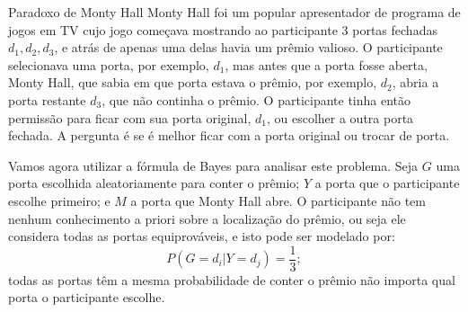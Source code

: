 \begin{frame}
\begin{block}{Paradoxo de Monty Hall}
	Monty Hall foi um popular apresentador de programa de jogos em TV cujo jogo começava mostrando ao participante 3 portas fechadas $d_1,d_2,d_3$, e atrás de apenas uma delas havia um prêmio valioso. O participante selecionava uma porta, por exemplo, $d_1$, mas antes que a porta fosse aberta, Monty Hall, que sabia em que porta estava o prêmio, por exemplo, $d_2$, abria a porta restante $d_3$, que não continha o prêmio. O participante tinha então permissão para ficar com sua porta original, $d_1$, ou escolher a outra porta fechada. A pergunta é se é melhor ficar com a porta original ou trocar de porta.
\end{block}

\begin{block}{}
	Vamos agora utilizar a fórmula de Bayes para analisar este problema. Seja $G$ uma porta escolhida aleatoriamente para conter o prêmio; $Y$ a porta que o participante escolhe primeiro; e $M$ a porta que Monty Hall abre. O participante não tem nenhum conhecimento a priori sobre a localização do prêmio, ou seja ele considera todas as portas equiprováveis, e isto pode ser modelado por:
	$$P(G=d_i|Y=d_j)=\frac{1}{3};$$
	todas as portas têm a mesma probabilidade de conter o prêmio não importa qual porta o participante escolhe.
\end{block}

\end{frame}


